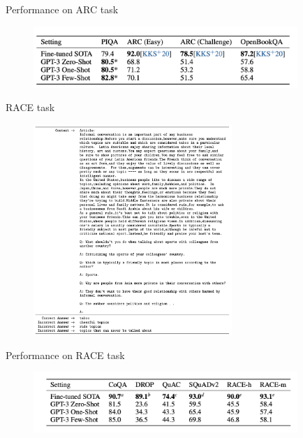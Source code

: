 
\begin{vbframe}{Performance on ARC task}

\vfill

	\begin{figure}
		\centering
		\includegraphics[width=10cm]{figure/arcperf.png}
	\end{figure}

\vfill

\end{vbframe}



\begin{vbframe}{RACE task}

\vfill

	\begin{figure}
		\centering
		\includegraphics[height=8cm]{figure/raceformat,h.png}
	\end{figure}
	
\vfill

\end{vbframe}




\begin{vbframe}{Performance on RACE task}

\vfill

	\begin{figure}
		\centering
		\includegraphics[width=10cm]{figure/raceperf.png}
	\end{figure}

\vfill

\end{vbframe}



